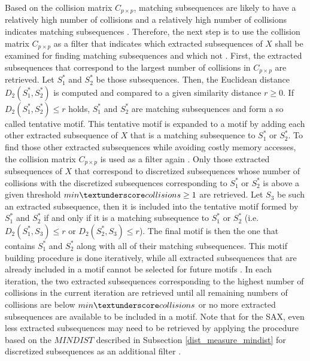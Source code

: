 Based on the collision matrix $C_{p \times p}$, matching subsequences are likely to have a relatively high number of collisions and a relatively high number of collisions indicates matching subsequences \cite{Random_Projection}. Therefore, the next step is to use the collision matrix $C_{p \times p}$ as a filter that indicates which extracted subsequences of $X$ shall be examined for finding matching subsequences and which not \cite{Random_Projection}. First, the extracted subsequences that correspond to the largest number of collisions in $C_{p \times p}$ are retrieved. Let $S_{1}^*$ and $S_{2}^*$ be those subsequences. Then, the Euclidean distance $D_2(S_{1}^*,S_{2}^*)$ is computed and compared to a given similarity distance $r \geq 0$. If $D_2(S_{1}^*,S_{2}^*) \leq r$ holds, $S_{1}^*$ and $S_{2}^*$ are matching subsequences and form a so called tentative motif. This tentative motif is expanded to a motif by adding each other extracted subsequence of $X$ that is a matching subsequence to $S_{1}^*$ or $S_{2}^*$. \newline
To find those other extracted subsequences while avoiding costly memory accesses, the collision matrix $C_{p \times p}$ is used as a filter again \cite{Random_Projection}. Only those extracted subsequences of $X$ that correspond to discretized subsequences whose number of collisions with the discretized subsequences corresponding to $S_{1}^*$ or $S_{2}^*$ is above a given threshold $min \textunderscore collisions \geq 1$ are retrieved. Let $S_3$ be such an extracted subsequence, then it is included into the tentative motif formed by $S_{1}^*$ and $S_{2}^*$ if and only if it is a matching subsequence to $S_{1}^*$ or $S_{2}^*$ (i.e. $D_2(S_{1}^*,S_{3}) \leq r$ or $D_2(S_{2}^*,S_{3}) \leq r$). The final motif is then the one that contains $S_{1}^*$ and $S_{2}^*$ along with all of their matching subsequences. This motif building procedure is done iteratively, while all extracted subsequences that are already included in a motif cannot be selected for future motifs \cite{Random_Projection}. In each iteration, the two extracted subsequences corresponding to the highest number of collisions in the current iteration are retrieved until all remaining numbers of collisions are below $min \textunderscore collisions$ or no more extracted subsequences are available to be included in a motif. \newline
Note that for the \ac{SAX}, even less extracted subsequences may need to be retrieved by applying the procedure based on the $MINDIST$ described in Subsection \ref{dist_measure_mindist} for discretized subsequences as an additional filter \cite{Random_Projection}.
